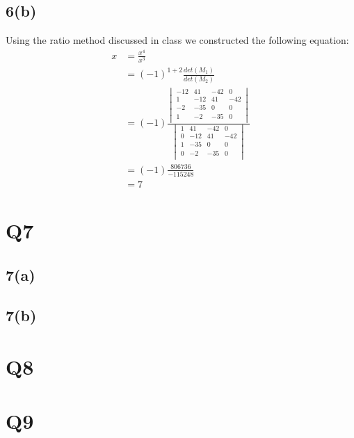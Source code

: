 \documentclass{article}
\begin{document}
\subsection{6(b)}
Using the ratio method discussed in class we constructed the following equation:
\begin{equation*}
\begin{aligned}
x &= \frac{x^4}{x^3} \\
&=(-1)^{1+2}\frac{det(M_1)}{det(M_2)} \\
&=(-1)\frac{
	\begin{vmatrix}
	-12 & 41 &-42 &  0\\
	  1 &-12 & 41 &-42\\
	 -2 &-35 &  0 &  0\\
	  1 & -2 &-35 &  0\\
	\end{vmatrix}
}{
	\begin{vmatrix}
	  1 & 41 &-42 &  0\\
	  0 &-12 & 41 &-42\\
	  1 &-35 &  0 &  0\\
	  0 & -2 &-35 &  0\\	
	\end{vmatrix}
}\\
&=(-1)\frac{806736}{-115248}\\
&=7
\end{aligned}
\end{equation*}
\section{Q7}
\subsection{7(a)}
\begin{figure}
\end{figure}
\subsection{7(b)}
\section{Q8}
\section{Q9}
\end{document}
